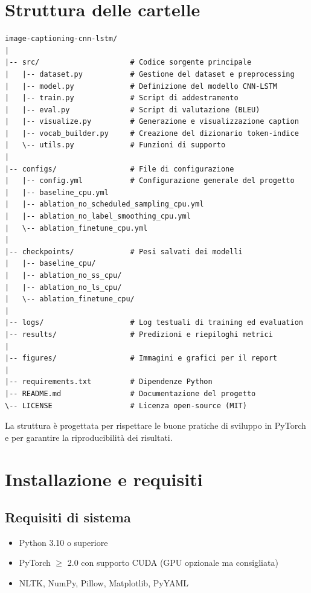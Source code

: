 \documentclass[11pt,a4paper]{report}
\begin{document}
\section{Struttura delle cartelle}

\begin{verbatim}
image-captioning-cnn-lstm/
|
|-- src/                     # Codice sorgente principale
|   |-- dataset.py           # Gestione del dataset e preprocessing
|   |-- model.py             # Definizione del modello CNN-LSTM
|   |-- train.py             # Script di addestramento
|   |-- eval.py              # Script di valutazione (BLEU)
|   |-- visualize.py         # Generazione e visualizzazione caption
|   |-- vocab_builder.py     # Creazione del dizionario token-indice
|   \-- utils.py             # Funzioni di supporto
|
|-- configs/                 # File di configurazione
|   |-- config.yml           # Configurazione generale del progetto
|   |-- baseline_cpu.yml
|   |-- ablation_no_scheduled_sampling_cpu.yml
|   |-- ablation_no_label_smoothing_cpu.yml
|   \-- ablation_finetune_cpu.yml
|
|-- checkpoints/             # Pesi salvati dei modelli
|   |-- baseline_cpu/
|   |-- ablation_no_ss_cpu/
|   |-- ablation_no_ls_cpu/
|   \-- ablation_finetune_cpu/
|
|-- logs/                    # Log testuali di training ed evaluation
|-- results/                 # Predizioni e riepiloghi metrici
|
|-- figures/                 # Immagini e grafici per il report
|
|-- requirements.txt         # Dipendenze Python
|-- README.md                # Documentazione del progetto
\-- LICENSE                  # Licenza open-source (MIT)
\end{verbatim}

\begin{tcolorbox}[title=Nota]
La struttura è progettata per rispettare le buone pratiche di sviluppo in PyTorch e per garantire la riproducibilità dei risultati.
\end{tcolorbox}

\section{Installazione e requisiti}

\subsection{Requisiti di sistema}
\begin{itemize}
  \item Python 3.10 o superiore
  \item PyTorch $\geq$ 2.0 con supporto CUDA (GPU opzionale ma consigliata)
  \item NLTK, NumPy, Pillow, Matplotlib, PyYAML
\end{itemize}
\end{document}
